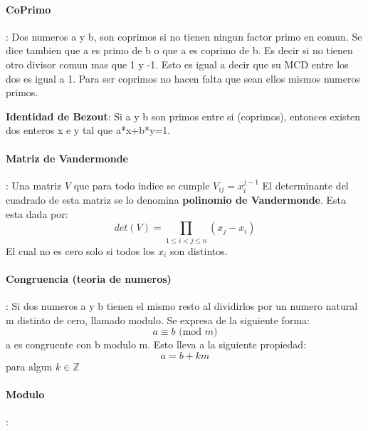 \documentclass[12pt, oneside]{article}
\newcommand{\Z}{\mathbb{Z}}
\begin{document}
\paragraph{CoPrimo}:
Dos numeros a y b, son coprimos si no tienen ningun factor primo en comun.
Se dice tambien que a es primo de b o que a es coprimo de b.
Es decir si no tienen otro divisor comun mas que 1 y -1.
Esto es igual a decir que su MCD entre los dos es igual a 1.
Para ser coprimos no hacen falta que sean ellos mismos numeros primos.

\textbf{Identidad de Bezout}: Si a y b son primos entre si (coprimos), entonces existen dos enteros x e y tal
que a*x+b*y=1.
\vspace{0.3cm}

\paragraph{Matriz de Vandermonde}:
Una matriz $V$ que para todo indice se cumple $V_{ij}=x_i^{j-1}$
El determinante del cuadrado de esta matriz se lo denomina \textbf{polinomio de Vandermonde}.
Esta esta dada por:
\begin{equation*}
  det(V) = \prod_{1\leq i < j \leq n}(x_j-x_i)
\end{equation*}
El cual no es cero solo si todos los $x_i$ son distintos.

\vspace{0.3cm}
\paragraph{Congruencia (teoria de numeros)}:
Si dos numeros a y b tienen el mismo resto al dividirlos por un numero natural
m distinto de cero, llamado modulo.
Se expresa de la siguiente forma:
\begin{equation*}
a \equiv b \text{ (mod } m)
\end{equation*}
a es congruente con b modulo m.
Esto lleva a la siguiente propiedad:
\begin{equation*}
  a = b + km
\end{equation*}
para algun $k\in \Z$


\vspace{0.3cm}
\paragraph{Modulo}:

\vspace{0.3cm}
\end{document}
